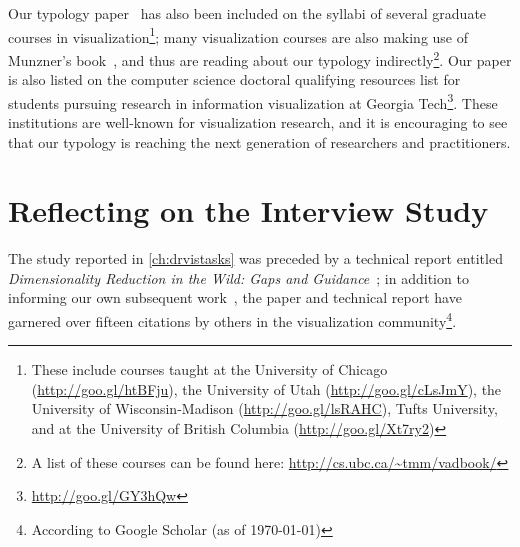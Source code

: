 Our typology paper~\cite{Brehmer2013} has also been included on the syllabi of several graduate courses in visualization\footnote{These include courses taught at the University of Chicago (\url{http://goo.gl/htBFju}), the University of Utah (\url{http://goo.gl/cLsJmY}), the University of Wisconsin-Madison (\url{http://goo.gl/lsRAHC}), Tufts University, and at the University of British Columbia (\url{http://goo.gl/Xt7ry2})}; many visualization courses are also making use of Munzner's book~\cite{Munzner2014}, and thus are reading about our typology indirectly\footnote{A list of these courses can be found here: \url{http://cs.ubc.ca/~tmm/vadbook/}}.
Our paper is also listed on the computer science doctoral qualifying resources list for students pursuing research in information visualization at Georgia Tech\footnote{\url{http://goo.gl/GY3hQw}}.
These institutions are well-known for visualization research, and it is encouraging to see that our typology is reaching the next generation of researchers and practitioners.


\section{Reflecting on the Interview Study}
\label{conclusions:drvistasks}


The study reported in \autoref{ch:drvistasks} was preceded by a technical report entitled {\it Dimensionality Reduction in the Wild: Gaps and Guidance}~\cite{Sedlmair2012b}; in addition to informing our own subsequent work~\cite{Hammer2015,Ingram2013,Ingram2015,Sedlmair2013,Sedlmair2014}, the paper and technical report have garnered over fifteen citations by others in the visualization community\footnote{According to Google Scholar (as of \today)}.

